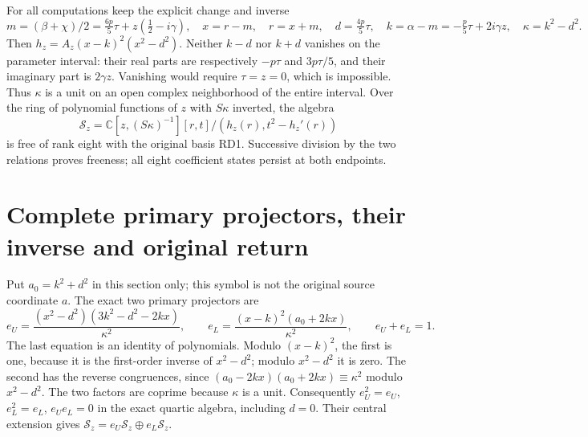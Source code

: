 For all computations keep the explicit change and inverse
\begin{equation}
 m=(\beta+\chi)/2=\tfrac{6p}{5}\tau+z(\tfrac12-i\gamma),\quad
 x=r-m,\quad r=x+m,\quad
 d=\tfrac{4p}{5}\tau,\quad k=\alpha-m=-\tfrac p5\tau+2i\gamma z,
 \quad\kappa=k^2-d^2.
 \tag{EF3}
\end{equation}
Then $h_z=A_z(x-k)^2(x^2-d^2)$. Neither $k-d$
nor $k+d$ vanishes on the parameter interval: their
real parts are respectively $-p\tau$ and $3p\tau/5$,
and their imaginary part is $2\gamma z$. Vanishing
would require $\tau=z=0$, which is impossible.
Thus $\kappa$ is a unit on an open complex neighborhood
of the entire interval. Over the ring of polynomial
functions of $z$ with $S\kappa$ inverted, the algebra
\begin{equation}
 \mathscr S_z=\mathbb C[z,(S\kappa)^{-1}][r,t]/
                  (h_z(r),t^2-h_z'(r))
 \tag{EF4}
\end{equation}
is free of rank eight with the original basis RD1.
Successive division by the two relations proves freeness;
all eight coefficient states persist at both endpoints.

\section{Complete primary projectors, their inverse and original return}
Put $a_0=k^2+d^2$ in this section only; this symbol is
not the original source coordinate $a$. The exact two
primary projectors are
\begin{equation}
 e_U=\frac{(x^2-d^2)(3k^2-d^2-2kx)}{\kappa^2},\qquad
 e_L=\frac{(x-k)^2(a_0+2kx)}{\kappa^2},\qquad
 e_U+e_L=1.
 \tag{EF5}
\end{equation}
The last equation is an identity of polynomials.
Modulo $(x-k)^2$, the first is one, because it is
the first-order inverse of $x^2-d^2$; modulo
$x^2-d^2$ it is zero. The second has the reverse
congruences, since
$(a_0-2kx)(a_0+2kx)\equiv\kappa^2$ modulo $x^2-d^2$.
The two factors are coprime because $\kappa$ is a unit.
Consequently $e_U^2=e_U$, $e_L^2=e_L$, $e_Ue_L=0$
in the exact quartic algebra, including $d=0$.
Their central extension gives
$\mathscr S_z=e_U\mathscr S_z\oplus e_L\mathscr S_z$.

